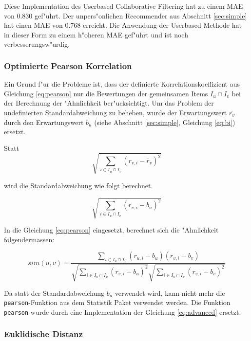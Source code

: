 \documentclass[a4paper, 12pt]{article}
\begin{document}
Diese Implementation des Userbased Collaborative Filtering hat zu einem MAE von 0.830 gef"uhrt. Der unpers"onlichen Recommender aus Abschnitt \ref{sec:simple} hat einen MAE von 0.768 erreicht. Die Anwendung der Userbased Methode hat in dieser Form zu einem h"oheren MAE gef"uhrt und ist noch verbesserungsw"urdig. 

\subsubsection{Optimierte Pearson Korrelation}
\label{sec:optpearson}

Ein Grund f"ur die Probleme ist, dass der definierte Korrelationskoeffizient aus Gleichung \ref{eq:pearson} nur die Bewertungen der gemeinsamen Items  $I_u \cap I_v$ bei der Berechnung der "Ahnlichkeit ber"ucksichtigt. Um das Problem der undefinierten Standardabweichung zu beheben, wurde der Erwartungswert $\bar{r_v}$ durch den Erwartungswert $b_u$ (siehe Abschnitt \ref{sec:simple}, Gleichung \ref{eq:bi}) ersetzt.

Statt 
\begin{equation}
  \label{eq:naiv}
  \sqrt{\sum_{i \in I_u \cap I_v}( r_{v,i} - \bar{r}_v)^2}
\end{equation}

wird die Standardabweichung wie folgt berechnet.

\begin{equation}
  \label{eq:naiv1}
  \sqrt{\sum_{i \in I_u \cap I_v}( r_{v,i} - b_u)^2}
\end{equation}

In die Gleichung \ref{eq:pearson} eingesetzt, berechnet sich die "Ahnlichkeit folgendermassen:

\begin{equation}
  \label{eq:advanced}
  sim(u,v)  = \frac{\sum_{i \in I_u \cap I_v}(r_{u,i} - b_u)(r_{v,i} - b_v)}{\sqrt{\sum_{i \in I_u \cap I_v}( r_{v,i} - b_u)^2}\sqrt{\sum_{i \in I_u \cap I_v}( r_{v,i} - b_v)^2}}
\end{equation}

Da statt der Standardabweichung $b_u$ verwendet wird, kann nicht mehr die \verb|pearson|-Funktion aus dem Statistik Paket verwendet werden. Die Funktion \verb|pearson| wurde durch eine Implementation der Gleichung \ref{eq:advanced} ersetzt.

\subsubsection{Euklidische Distanz}
\label{sec:euclid}
\end{document}
